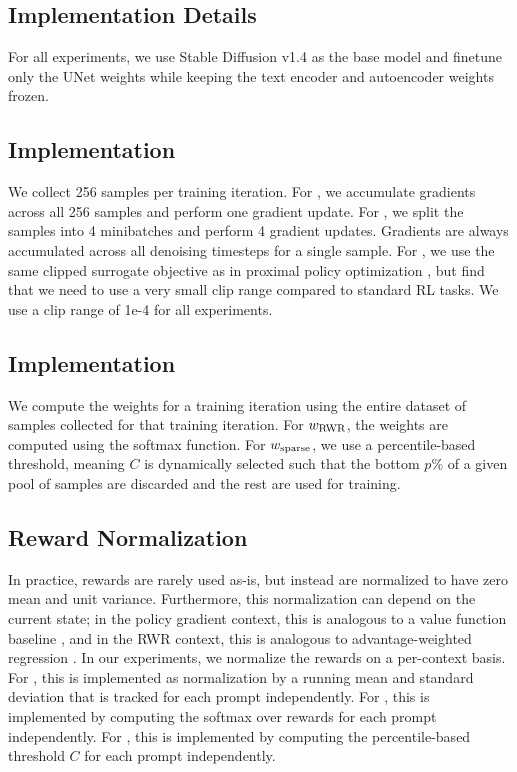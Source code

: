 \begin{appendices}





\section{Implementation Details}
\label{app:details}

For all experiments, we use Stable Diffusion v1.4 \citep{rombach2022latent} as the base model and finetune only the UNet weights while keeping the text encoder and autoencoder weights frozen.


\subsection{\methodours{} Implementation}
We collect 256 samples per training iteration.
For \methodreinforce, we accumulate gradients across all 256 samples and perform one gradient update.
For \methodppo, we split the samples into 4 minibatches and perform 4 gradient updates.
Gradients are always accumulated across all denoising timesteps for a single sample.
For \methodppo, we use the same clipped surrogate objective as in proximal policy optimization \citep{schulman2017ppo}, but find that we need to use a very small clip range compared to standard RL tasks. We use a clip range of 1e-4 for all experiments.

\subsection{\methodrwr{} Implementation}
We compute the weights for a training iteration using the entire dataset of samples collected for that training iteration.
For $w_{\text{RWR}}$, the weights are computed using the softmax function.
For $w_{\text{sparse}}$, we use a percentile-based threshold, meaning $C$ is dynamically selected such that the bottom $p$\% of a given pool of samples are discarded and the rest are used for training.

\subsection{Reward Normalization}
In practice, rewards are rarely used as-is, but instead are normalized to have zero mean and unit variance. Furthermore, this normalization can depend on the current state; in the policy gradient context, this is analogous to a value function baseline \citep{sutton1999policy}, and in the RWR context, this is analogous to advantage-weighted regression \citep{peng2019advantage}. In our experiments, we normalize the rewards on a per-context basis. For \methodours, this is implemented as normalization by a running mean and standard deviation that is tracked for each prompt independently. For \methodrwr, this is implemented by computing the softmax over rewards for each prompt independently. For \methodff, this is implemented by computing the percentile-based threshold $C$ for each prompt independently.


\end{appendices}
